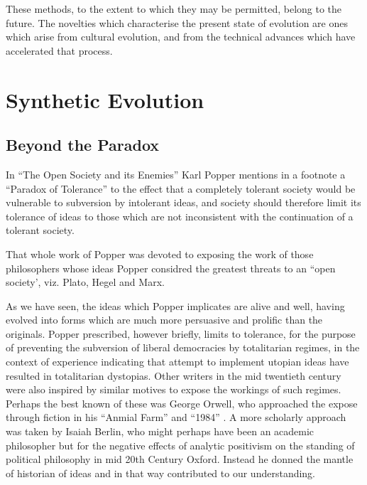 \documentclass[10pt,titlepage]{book}
\begin{document}
These methods, to the extent to which they may be permitted,  belong to the future.
The novelties which characterise the present state of evolution are ones which arise from cultural evolution, and from the technical advances which have accelerated that process.



\part{Synthetic Evolution}

\chapter{Beyond the Paradox}

In ``The Open Society and its Enemies'' Karl Popper mentions in a footnote a ``Paradox of Tolerance'' to the effect that a completely tolerant society would be vulnerable to subversion by intolerant ideas, and society should therefore limit its tolerance of ideas to those which are not inconsistent with the continuation of a tolerant society.

That whole work of Popper was devoted to exposing the work of those philosophers whose ideas Popper considred the greatest threats to an ``open society', viz. Plato, Hegel and Marx.

As we have seen, the ideas which Popper implicates are alive and well, having evolved into forms which are much more persuasive and prolific than the originals.
Popper prescribed, however briefly, limits to tolerance, for the purpose of preventing the subversion of liberal democracies by totalitarian regimes, in the context of experience indicating that attempt to implement utopian ideas have resulted in totalitarian dystopias.
Other writers in the mid twentieth century were also inspired by similar motives to expose the workings of such regimes.
Perhaps the best known of these was George Orwell, who approached the expose through fiction in his ``Anmial Farm'' and ``1984'' \cite{orwell-af,orwell-1984,orwell-fd}.
A more scholarly approach was taken by Isaiah Berlin, who might perhaps have been an academic philosopher but for the negative effects of analytic positivism on the standing of political philosophy in mid 20th Century Oxford.
Instead he donned the mantle of historian of ideas and in that way contributed to our understanding.
 
\backmatter


{}








\end{document}
